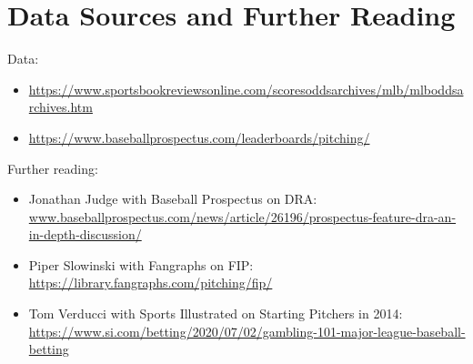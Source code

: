 \documentclass [52pt] {article}
\begin{document}
\section{Data Sources and Further Reading}
Data:\\
    \begin{itemize}
    \item\url{https://www.sportsbookreviewsonline.com/scoresoddsarchives/mlb/mlboddsarchives.htm}
    \item \url{https://www.baseballprospectus.com/leaderboards/pitching/}
    \end{itemize}
    \vspace{0.4cm}
    
    \noindent Further reading:
   \begin{itemize}

\item    Jonathan Judge with Baseball Prospectus on DRA:\\
    \href{https://www.baseballprospectus.com/news/article/26196/prospectus-feature-dra-an-in-depth-discussion/}{www.baseballprospectus.com/news/article/26196/prospectus-feature-dra-an-in-depth-discussion/}\\
    \vspace{0.3cm}
    
\item    Piper Slowinski with Fangraphs on FIP:\\
    \url{https://library.fangraphs.com/pitching/fip/}
    \vspace{0.3cm}
    
\item    Tom Verducci with Sports Illustrated on Starting Pitchers in 2014:\\
    \url{https://www.si.com/betting/2020/07/02/gambling-101-major-league-baseball-betting}
    
\end{itemize}
\end{document}
